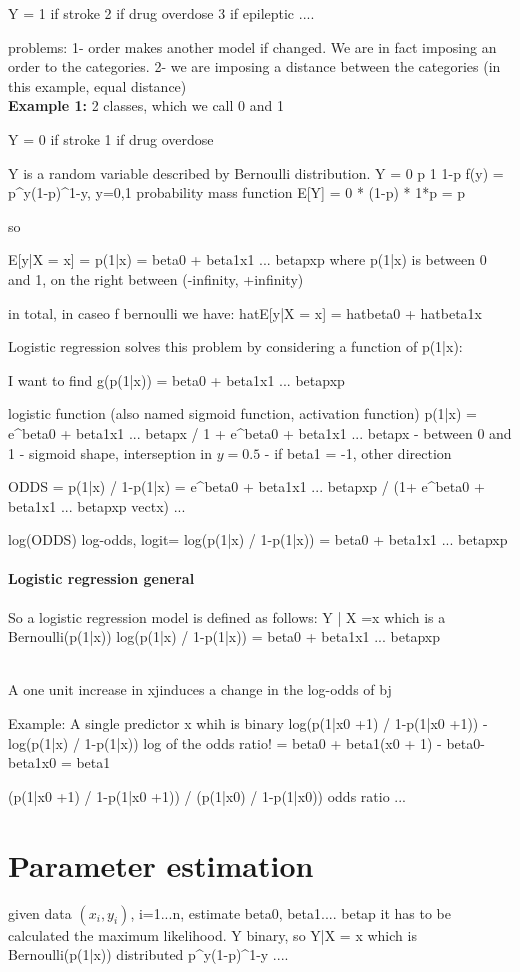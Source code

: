 Y = 1 if stroke
	2 if drug overdose
	3 if epileptic ....

problems:
1- order makes another model if changed. We are in fact imposing an order to the categories.
2- we are imposing a distance between the categories (in this example, equal distance)
\\
\textbf{Example 1:} 2 classes, which we call 0 and 1

Y = 0 if stroke
	1 if drug overdose

Y is a random variable described by Bernoulli distribution.
Y = 0 p
	1 1-p
f(y) = p^y(1-p)^1-y, y=0,1 probability mass function
E[Y] = 0 * (1-p) * 1*p = p

so

E[y|X = x] = p(1|x) = beta0 + beta1x1 ... betapxp
where p(1|x) is between 0 and 1, on the right between (-infinity, +infinity)

in total, in caseo f bernoulli we have:
hatE[y|X = x] = hatbeta0 + hatbeta1x

Logistic regression solves this problem by considering a function of p(1|x):

I want to find g(p(1|x)) = beta0 + beta1x1 ... betapxp

logistic function (also named sigmoid function, activation function)
p(1|x) = e^{beta0 + beta1x1 ... betapx} / 1 + e^{beta0 + beta1x1 ... betapx}
- between 0 and 1
- sigmoid shape, interseption in $y=0.5$
- if beta1 = -1, other direction


ODDS = p(1|x) / 1-p(1|x) = e^{beta0 + beta1x1 ... betapxp} / (1+ e^{beta0 + beta1x1 ... betapxp} vectx) ... 

log(ODDS) log-odds, logit= log(p(1|x) / 1-p(1|x)) = beta0 + beta1x1 ... betapxp

\paragraph{Logistic regression general}
So a logistic regression model is defined as follows:
Y | X =x which is a Bernoulli(p(1|x))
log(p(1|x) / 1-p(1|x)) =  beta0 + beta1x1 ... betapxp

\\

A one unit increase in xjinduces a change in the log-odds of bj

Example: A single predictor x whih is binary
log(p(1|x0 +1) / 1-p(1|x0 +1)) - log(p(1|x) / 1-p(1|x)) log of the odds ratio!
= beta0 + beta1(x0 + 1) - beta0-beta1x0 = beta1

(p(1|x0 +1) / 1-p(1|x0 +1)) / (p(1|x0) / 1-p(1|x0)) odds ratio ...

\section{Parameter estimation}
given data $(x_i, y_i)$, i=1...n, estimate beta0, beta1.... betap
it has to be calculated the maximum likelihood.
Y binary, so Y|X = x which is Bernoulli(p(1|x)) distributed p^y(1-p)^1-y ....
